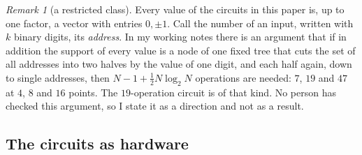 \documentclass[10pt]{article}
\theoremstyle{remark}
\newtheorem{remark}[proposition]{Remark}
\renewcommand{\lg}{\log_2}
\begin{document}
\begin{remark}[a restricted class]
Every value of the circuits in this paper is, up to one factor, a vector with entries $0,\pm1$. Call the
number of an input, written with $k$ binary digits, its \emph{address}. In my working
notes there is an argument that if in addition the support of every value is a node of one fixed tree that
cuts the set of all addresses into two halves by the value of one digit, and each half again, down to single
addresses, then $N-1+\tfrac12N\lg N$ operations are needed: $7$, $19$ and $47$
at $4$, $8$ and $16$ points. The $19$-operation circuit is of that kind. No person has checked this
argument, so I state it as a direction and not as a result.
\end{remark}

\subsection*{The circuits as hardware}
\end{document}
